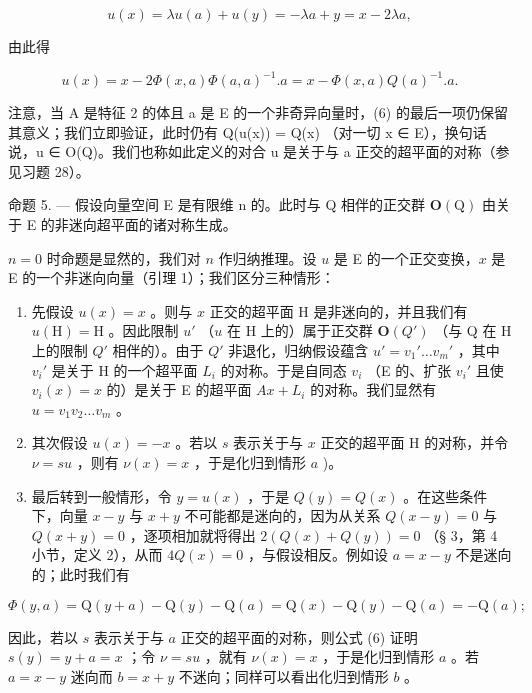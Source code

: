 \[
u (x) = \lambda u (a) + u (y) = - \lambda a + y = x - 2 \lambda a,
\]

由此得

\[
u (x) = x - 2 \Phi (x, a) \Phi (a, a) ^ {- 1}. a = x - \Phi (x, a) Q (a) ^ {- 1}. a.\tag{6}
\]

注意，当 A 是特征 2 的体且 a 是 E 的一个非奇异向量时，(6) 的最后一项仍保留其意义；我们立即验证，此时仍有 Q(u(x)) = Q(x) （对一切 x ∈ E），换句话说，u ∈ O(Q)。我们也称如此定义的对合 u 是关于与 a 正交的超平面的对称（参见习题 28）。

命题 5. --- 假设向量空间 E 是有限维 n 的。此时与 Q 相伴的正交群 \(\mathbf{O}(\mathrm{Q})\) 由关于 E 的非迷向超平面的诸对称生成。

\(n=0\) 时命题是显然的，我们对 \(n\) 作归纳推理。设 \(u\) 是 E 的一个正交变换，\(x\) 是 E 的一个非迷向向量（引理 1）；我们区分三种情形：

\begin{enumerate}
\def\labelenumi{\alph{enumi})}
\item
  先假设 \(u(x) = x\) 。则与 \(x\) 正交的超平面 H 是非迷向的，并且我们有 \(u(\mathrm{H}) = \mathrm{H}\) 。因此限制 \(u'\) （\(u\) 在 H 上的）属于正交群 \(\mathbf{O}(Q')\) （与 Q 在 H 上的限制 \(Q'\) 相伴的）。由于 \(Q'\) 非退化，归纳假设蕴含 \(u' = v_1' \ldots v_m'\) ，其中 \(v_i'\) 是关于 H 的一个超平面 \(L_i\) 的对称。于是自同态 \(v_i\) （E 的、扩张 \(v_i'\) 且使 \(v_i(x) = x\) 的）是关于 E 的超平面 \(Ax + L_i\) 的对称。我们显然有 \(u = v_1v_2 \ldots v_m\) 。
\item
  其次假设 \(u(x) = -x\) 。若以 \(s\) 表示关于与 \(x\) 正交的超平面 H 的对称，并令 \(\nu = su\) ，则有 \(\nu(x) = x\) ，于是化归到情形 \(a\) )。
\item
  最后转到一般情形，令 \(y = u(x)\) ，于是 \(Q(y) = Q(x)\) 。在这些条件下，向量 \(x - y\) 与 \(x + y\) 不可能都是迷向的，因为从关系 \(Q(x - y) = 0\) 与 \(Q(x + y) = 0\) ，逐项相加就将得出 \(2(Q(x) + Q(y)) = 0\) （§ 3，第 4 小节，定义 2），从而 \(4Q(x) = 0\) ，与假设相反。例如设 \(a = x - y\) 不是迷向的；此时我们有
\end{enumerate}

\[
\Phi (y, a) = \mathrm{Q} (y + a) - \mathrm{Q} (y) - \mathrm{Q} (a) = \mathrm{Q} (x) - \mathrm{Q} (y) - \mathrm{Q} (a) = - \mathrm{Q} (a);
\]

因此，若以 \(s\) 表示关于与 \(a\) 正交的超平面的对称，则公式 (6) 证明 \(s(y) = y + a = x\) ；令 \(\nu = su\) ，就有 \(\nu(x) = x\) ，于是化归到情形 \(a\) 。若 \(a = x - y\) 迷向而 \(b = x + y\) 不迷向；同样可以看出化归到情形 \(b\) 。

